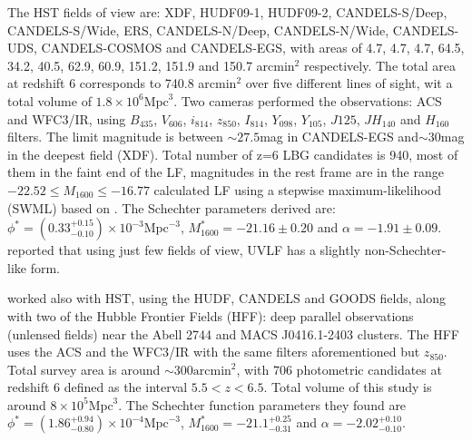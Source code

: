 \documentclass{emulateapj}
\begin{document}
The HST fields of view are: XDF, HUDF09-1, HUDF09-2, CANDELS-S/Deep, 
CANDELS-S/Wide, ERS, CANDELS-N/Deep, CANDELS-N/Wide, CANDELS-UDS, 
CANDELS-COSMOS and CANDELS-EGS, with areas of 4.7, 4.7, 4.7, 64.5, 34.2, 
40.5, 62.9, 60.9, 151.2, 151.9 and 150.7 arcmin$^2$ respectively. The total area 
at redshift 6 corresponds 
to 740.8 arcmin$^2$ over five different lines of sight, wit a total volume of 
$1.8 \times 10^6 \textrm{Mpc}^3$.
Two cameras performed the observations: ACS and WFC3/IR, using 
$B_{435}$, $V_{606}$, $ i_{814}$, $ z_{850}$, $ I_{814}$, $Y_{098}$, $Y_{105}$, $J{125}$, 
$JH_{140}$ and $H_{160}$ filters.
The limit magnitude is between $\sim27.5$mag in CANDELS-EGS and$\sim30 $mag in the 
deepest field (XDF). Total number of z=6 LBG candidates is 940, most of them in the faint 
end of the LF, magnitudes in the rest frame are in the range $-22.52\leq M_{1600} \leq -16.77$
\citet{bouwens14} calculated LF using a stepwise maximum-likelihood (SWML) based on \citet{efstathiou88}. 
The Schechter parameters derived are: 
$\phi^* =(0.33_{-0.10}^{+0.15}) \times 10 ^{-3}  \textrm{Mpc}^{-3} $, 
$M^*_{1600} = -21.16\pm 0.20$ and $\alpha = -1.91 \pm 0.09$. 
\citet{bouwens14} reported that using just few fields of view, UVLF has a slightly non-Schechter-like form. 

\citet{finkelstein14} worked also with HST, using the HUDF, CANDELS and GOODS fields, 
along with two of the Hubble Frontier Fields (HFF): deep parallel observations (unlensed 
fields) near the Abell 2744 and MACS J0416.1-2403 clusters. The HFF uses the ACS and 
the WFC3/IR with the same filters aforementioned but $z_{850}$. Total survey area is around 
$\sim300\textrm{arcmin}^2$, with 706 photometric candidates at redshift 6 defined as the interval $5.5<z<6.5$. 
Total volume of this study is around $ 8 \times 10^5 \textrm{Mpc}^3$. The Schechter function parameters they found are $\phi^* =(1.86_{-0.80}^{+0.94}) \times 10 ^{-4}  \textrm{Mpc}^{-3} $, 
$M^*_{1600} = -21.1_{-0.31}^{+0.25}$ and $\alpha = -2.02_{-0.10}^{+0.10}$. 
\end{document}
